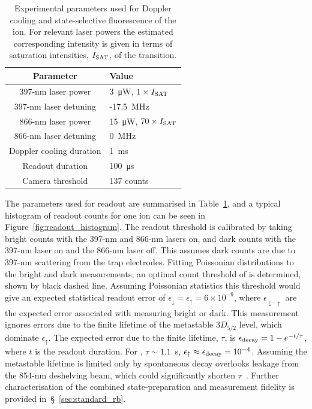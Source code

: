    \begin{table}
        \begin{center}
        \begin{tabular}{|c|l|}
            \hline
            Parameter & Value \\
            \hline
            397-nm laser power & 3~\unit{\uW}, $1\times I_{\rm SAT}$ \\
            397-nm laser detuning & -17.5~\unit{\MHz}\\
            866-nm laser power & 15~\unit{\uW}, $70\times I_{\rm SAT}$\\
            866-nm laser detuning & 0~\unit{\MHz} \\
            Doppler cooling duration & 1~\unit{\ms}\\
            Readout duration & 100~\unit{\us} \\
            Camera threshold & 137 counts \\
            \hline
        \end{tabular}
        \end{center}
        \caption{
            Experimental parameters used for Doppler cooling and state-selective fluorescence of the ion. For relevant laser powers the estimated corresponding intensity is given in terms of saturation intensities, $I_{\rm SAT}$, of the transition.
            }
        \label{tab:397_parameters}
    \end{table}
    The parameters used for readout are
    summarised in Table~\ref{tab:397_parameters}, and a typical histogram of
    readout counts for one ion can be seen in
    Figure~\ref{fig:readout_histogram}. The readout threshold is calibrated by taking bright counts with the 397-nm and 866-nm lasers on, and dark counts with the 397-nm laser on and the 866-nm laser off. This assumes dark counts are due to 397-nm scattering from the trap electrodes. 
    Fitting Poissonian distributions to the bright and dark measurements, an optimal count threshold of
    is determined, shown by black dashed line. Assuming Poissonian statistics this threshold would give an expected
    statistical readout error of $\epsilon_\downarrow = \epsilon_\uparrow = 6\times10^{-9}$, where $\epsilon_{\downarrow,\uparrow}$ are the expected error associated with measuring bright or dark. This measurement ignores errors due to the
    finite lifetime of the metastable $3D_{5/2}$ level, which dominate $\epsilon_\uparrow$. The expected error due
    to the finite lifetime, $\tau$, is $\epsilon_{\rm decay} = 1 - e^{-t/\tau}$, where $t$ is the readout duration. For \ca, $\tau \sim 1.1$~s, $\epsilon_\uparrow \approx \epsilon_{\rm decay}  = 
    10^{-4}$. 
    Assuming the metastable lifetime is limited only by spontaneous decay overlooks leakage from the 854-nm deshelving beam, which could significantly shorten $\tau$~\cite{sotirova_high-fidelity_2024}. Further characterisation of the combined state-preparation and measurement fidelity is provided in~\S~\ref{sec:standard_rb}.


